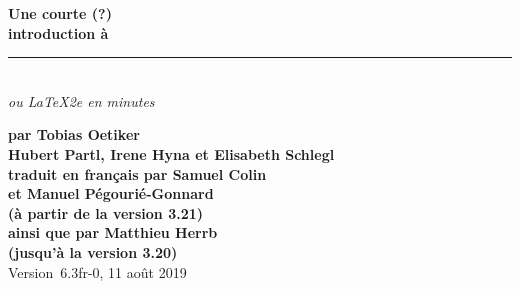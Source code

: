 

\ifpdf
\fi
\newlength{\centeroffset}
\setlength{\centeroffset}{-0.5\oddsidemargin}
\addtolength{\centeroffset}{0.5\evensidemargin}
\addtolength{\textwidth}{-\centeroffset}
\thispagestyle{empty}
\noindent\hspace*{\centeroffset}%
\begin{minipage}{\textwidth}
\parindent=0pt
\flushright
{\Huge\bfseries Une courte (?)\\
introduction à \LaTeXe}\\
\rule[-1ex]{\textwidth}{5pt}\\[2.5ex]
\emph{\Large ou \LaTeX2e en \pageref{LastPage} minutes}\\[2ex]
\end{minipage}

\noindent\hspace*{\centeroffset}\begin{minipage}{\textwidth}
\flushright
{\bfseries
par Tobias Oetiker\\[1.5ex]
Hubert Partl, Irene Hyna et  Elisabeth Schlegl\\[1.5ex]
traduit en français par Samuel Colin\\
  et Manuel Pégourié-Gonnard\\
(à partir de la version 3.21)\\[3ex]
ainsi que par Matthieu Herrb\\
(jusqu'à la version 3.20)\\[3ex]}
Version~6.3fr-0, 11 août 2019
\end{minipage}
\addtolength{\textwidth}{\centeroffset}


\pagebreak

\endinput


%

